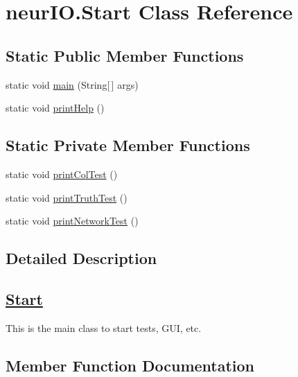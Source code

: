 \hypertarget{classneur_i_o_1_1_start}{}\section{neur\+I\+O.\+Start Class Reference}
\label{classneur_i_o_1_1_start}
\subsection*{Static Public Member Functions}
\begin{DoxyCompactItemize}
\item 
static void \hyperlink{classneur_i_o_1_1_start_aef3f6b2b34c677ae10ff69b507a2d4b4}{main} (String\mbox{[}$\,$\mbox{]} args)
\item 
static void \hyperlink{classneur_i_o_1_1_start_ae057e60dad95a9bd37e41c860cae2fab}{print\+Help} ()
\end{DoxyCompactItemize}
\subsection*{Static Private Member Functions}
\begin{DoxyCompactItemize}
\item 
static void \hyperlink{classneur_i_o_1_1_start_a2e18a32a484aa296caae592b4c8b9acd}{print\+Col\+Test} ()
\item 
static void \hyperlink{classneur_i_o_1_1_start_aedb59a7fabe14787e4d792a87bb23c7b}{print\+Truth\+Test} ()
\item 
static void \hyperlink{classneur_i_o_1_1_start_ae0f93675889ad60b4c42b39a64e94910}{print\+Network\+Test} ()
\end{DoxyCompactItemize}


\subsection{Detailed Description}
\subsection*{\hyperlink{classneur_i_o_1_1_start}{Start} }

This is the main class to start tests, G\+UI, etc. 

\subsection{Member Function Documentation}
\mbox{\label{classneur_i_o_1_1_start_aef3f6b2b34c677ae10ff69b507a2d4b4}} 
